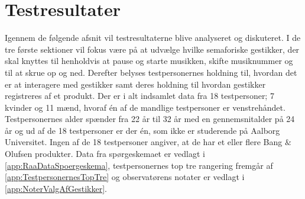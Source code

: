 \chapter{Testresultater}
\label{Testresultater}
%
Igennem de følgende afsnit vil testresultaterne blive analyseret og diskuteret. I de tre første sektioner vil fokus være på at udvælge hvilke semaforiske gestikker, der skal knyttes til henholdvis at pause og starte musikken, skifte musiknummer og til at skrue op og ned. Derefter belyses testpersonernes holdning til, hvordan det er at interagere med gestikker samt deres holdning til hvordan gestikker registreres af et produkt.\blankline
%
Der er i alt indsamlet data fra 18 testpersoner; 7 kvinder og 11 mænd, hvoraf én af de mandlige testpersoner er venstrehåndet. Testpersonernes alder spænder fra 22 år til 32 år med en gennemsnitalder på 24 år og ud af de 18 testpersoner er der én, som ikke er studerende på Aalborg Universitet. Ingen af de 18 testpersoner angiver, at de har et eller flere Bang $\&$ Olufsen produkter. Data fra spørgeskemaet er vedlagt i \autoref{app:RaaDataSpoergeskema}, testpersonernes top tre rangering fremgår af \autoref{app:TestpersonernesTopTre} og observatørens notater er vedlagt i \autoref{app:NoterValgAfGestikker}.     